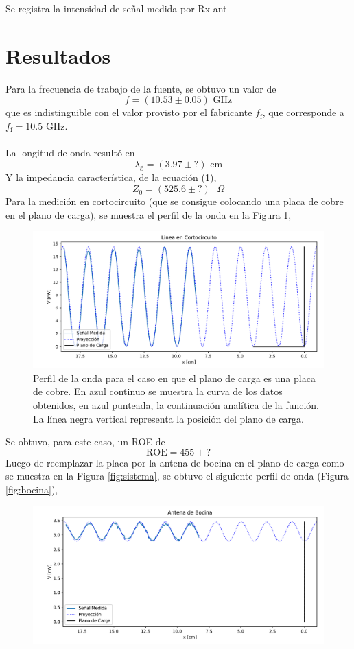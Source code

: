 \documentclass[11pt,a4paper]{article}
\begin{document}
\begin{multicols}{2}
Se registra la intensidad de señal medida por Rx ant

\section{Resultados}
Para la frecuencia de trabajo de la fuente, se obtuvo un valor de 
$$
f = (10.53 \pm 0.05) \text{ GHz}
$$
que es indistinguible con el valor provisto por el fabricante $f_\text{f}$, que corresponde a $f_\text{f}=10.5$ GHz. \\ \\
La longitud de onda resultó en
$$
\lambda_\text{g} = (3.97 \pm ?) \text{ cm} 
$$
Y la impedancia característica, de la ecuación (1),
$$
Z_0 = (525.6 \pm ?) \text{ } \Omega
$$
Para la medición en cortocircuito (que se consigue colocando una placa de cobre en el plano de carga), se muestra el perfil de la onda en la Figura \ref{fig:cortocir}, 
\begin{figure}[H]
    \centering
    \includegraphics[width=\linewidth]{Images/lineacc.pdf}
    \caption{Perfil de la onda para el caso en que el plano de carga es una placa de cobre. En azul continuo se muestra la curva de los datos obtenidos, en azul punteada, la continuación analítica de la función. La línea negra vertical representa la posición del plano de carga.}
    \label{fig:cortocir}
\end{figure}
Se obtuvo, para este caso, un ROE de
$$
\text{ROE} = 455\pm?
$$
Luego de reemplazar la placa por la antena de bocina en el plano de carga como se muestra en la Figura \ref{fig:sistema}, se obtuvo el siguiente perfil de onda (Figura \ref{fig:bocina}),
\begin{figure}[H]
    \centering
    \includegraphics[width=\linewidth]{Images/antena_bocina.pdf}

\end{figure}
\end{multicols}
\end{document}
